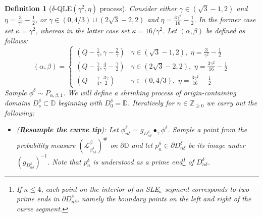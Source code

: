\documentclass[a4paper]{article}
\numberwithin{equation}{section}
\newcommand{\D}{\mathbb{D}}
\newcommand{\cL}{\mathcal{L}}
\newtheorem{definition}[theorem]{Definition}
\theoremstyle{remark}
\numberwithin{equation}{section}
\begin{document}
\begin{definition}[$\delta$-QLE$(\gamma^2, \eta)$ process] \label{def-delta-QLE-finite}
Consider either $\gamma \in (\sqrt3 -1,2)$ and $\eta = \frac3{\gamma^2} - \frac12$, or $\gamma \in (0, 4/3) \cup (2\sqrt3 - 2,2)$ and $\eta = \frac{3\gamma^2}{16} - \frac12$. In the former case set $\kappa = \gamma^2$, whereas in the latter case set $\kappa = 16/\gamma^2$.
Let $(\alpha,\beta)$ be defined as follows:
\begin{equation*} (\alpha, \beta) = 
        \begin{cases} 
          (Q-\frac{1}{\gamma},\gamma - \frac2\gamma) & \gamma \in (\sqrt3 - 1,2), \, \, \eta = \frac3{\gamma^2} - \frac12 \\
            (Q-\frac{\gamma}{4},\frac4\gamma - \frac\gamma2) & \gamma \in (2\sqrt3 - 2, 2), \, \, \eta = \frac{3\gamma^2}{16} - \frac12 \\
          (Q-\frac{\gamma}{4},\frac{3\gamma}{2}) & \gamma \in (0, 4/3), \, \,  \eta = \frac{3\gamma^2}{16} - \frac12 
       \end{cases}
    \end{equation*}
Sample $\phi^\delta \sim P_{\alpha, \beta, 1}$. We will define a shrinking process of origin-containing domains $D_s^\delta \subset \D$ beginning with $D_0^\delta = \D$. 
Iteratively for $n \in \mathbb Z_{\geq 0}$ we carry out the following:
    \begin{itemize}
        \item (\textbf{Resample the curve tip}): 
        Let $\phi^\delta_{n\delta} = g_{D^\delta_{n\delta}} \bullet_\gamma \phi^\delta$. 
        Sample a point from the probability measure $(\cL_{\phi_{n\delta}^\delta}^{\beta})^\#$ on $\partial \D$ and let $p^\delta_n \in \partial D_{n\delta}^\delta$ be its image under $(g_{D_{n\delta}^\delta})^{-1}$. Note that $p^\delta_n$ is understood as a prime end\footnote{If $\kappa \leq 4$, each point on the interior of an SLE$_\kappa$ segment corresponds to two prime ends in $\partial D^\delta_{n\delta}$, namely the boundary points on the left and right of the curve segment.} of $D_{n\delta}^\delta$. 
        

\end{itemize}
\end{definition}
\end{document}
